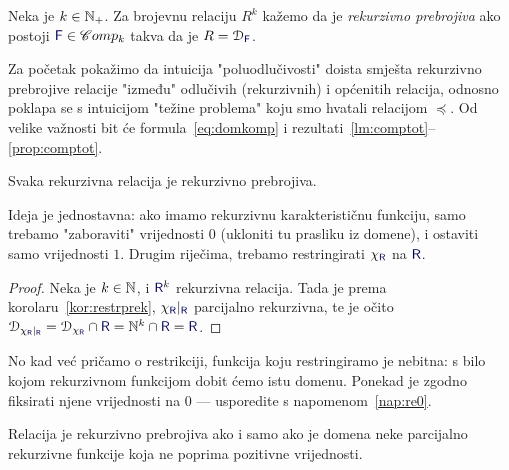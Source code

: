 \begin{definicija}[{name=[rekurzivna prebrojivost]}]
Neka je $k\in{\mathbb N}_+$. Za brojevnu relaciju $R^k$ kažemo da je \emph{rekurzivno prebrojiva} ako postoji $\f F\in\mathscr Comp_k$ takva da je $R=\dom{\f F}$.
\end{definicija}



Za početak pokažimo da intuicija "poluodlučivosti" doista smješta rekurzivno prebrojive relacije "između" odlučivih (rekurzivnih) i općenitih relacija, odnosno poklapa se s intuicijom "težine problema" koju smo hvatali relacijom $\preceq$. Od velike važnosti bit će formula~\eqref{eq:domkomp} i rezultati~\ref{lm:comptot}--\ref{prop:comptot}.

\begin{propozicija}[{name=[rekurzivna prebrojivost rekurzivnih relacija]}]\label{pp:rekire}
Svaka rekurzivna relacija je rekurzivno prebrojiva.
\end{propozicija}
Ideja je jednostavna: ako imamo rekurzivnu karakterističnu funkciju, samo trebamo "zaboraviti" vrijednosti $0$ (ukloniti tu prasliku iz domene), i ostaviti samo vrijednosti $1$. Drugim riječima, trebamo restringirati $\chi_{\f R}$ na $\f R$.
\begin{proof}
Neka je $k\in{\mathbb N}$, i $\f R^k$ rekurzivna relacija. Tada je prema korolaru~\ref{kor:restrprek}, $\chi_{\f R}|_{\f R}$ parcijalno rekurzivna, te je očito $\dom{\chi_{\f R}|_{\f R}}=\dom{\chi_{\f R}}\cap\f R=\N^k\cap\f R=\f R$.
\end{proof}

No kad već pričamo o restrikciji, funkcija koju restringiramo je nebitna: s bilo kojom rekurzivnom funkcijom dobit ćemo istu domenu. Ponekad je zgodno fiksirati njene vrijednosti na $0$ --- usporedite s napomenom~\ref{nap:re0}.

\begin{korolar}[{name=[za rekurzivno prebrojive domene vrijednosti funkcije nisu bitne]}]\label{kor:redom0im}
Relacija je rekurzivno prebrojiva ako i samo ako je domena neke parcijalno rekurzivne funkcije koja ne poprima pozitivne vrijednosti.
\end{korolar}

